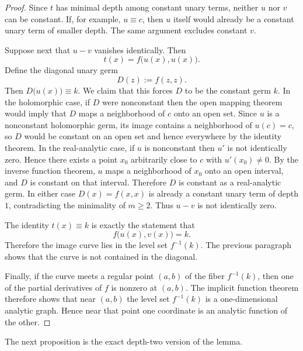 \documentclass[11pt]{amsart}
\numberwithin{equation}{section}
\theoremstyle{remark}
\theoremstyle{definition}
\begin{document}
\begin{proof}
Since $t$ has minimal depth among constant unary terms, neither $u$ nor $v$ can be constant. If, for example, $u\equiv c$, then $u$ itself would already be a constant unary term of smaller depth. The same argument excludes constant $v$.

Suppose next that $u-v$ vanishes identically. Then
\[
t(x)=f\bigl(u(x),u(x)\bigr).
\]
Define the diagonal unary germ
\[
D(z):=f(z,z).
\]
Then $D\bigl(u(x)\bigr)\equiv k$. We claim that this forces $D$ to be the constant germ $k$. In the holomorphic case, if $D$ were nonconstant then the open mapping theorem would imply that $D$ maps a neighborhood of $c$ onto an open set. Since $u$ is a nonconstant holomorphic germ, its image contains a neighborhood of $u(c)=c$, so $D$ would be constant on an open set and hence everywhere by the identity theorem. In the real-analytic case, if $u$ is nonconstant then $u'$ is not identically zero. Hence there exists a point $x_0$ arbitrarily close to $c$ with $u'(x_0)\neq 0$. By the inverse function theorem, $u$ maps a neighborhood of $x_0$ onto an open interval, and $D$ is constant on that interval. Therefore $D$ is constant as a real-analytic germ. In either case $D(x)=f(x,x)$ is already a constant unary term of depth $1$, contradicting the minimality of $m\geq 2$. Thus $u-v$ is not identically zero.

The identity $t(x)\equiv k$ is exactly the statement that
\[
f\bigl(u(x),v(x)\bigr)=k.
\]
Therefore the image curve lies in the level set $f^{-1}(k)$. The previous paragraph shows that the curve is not contained in the diagonal.

Finally, if the curve meets a regular point $(a,b)$ of the fiber $f^{-1}(k)$, then one of the partial derivatives of $f$ is nonzero at $(a,b)$. The implicit function theorem therefore shows that near $(a,b)$ the level set $f^{-1}(k)$ is a one-dimensional analytic graph. Hence near that point one coordinate is an analytic function of the other.
\end{proof}

The next proposition is the exact depth-two version of the lemma.
\end{document}
